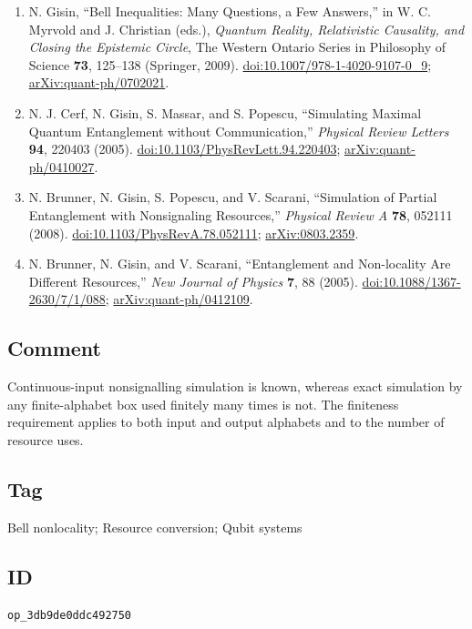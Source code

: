 \begin{enumerate}[label={},leftmargin=4.8em,labelsep=0.5em]
  \footnotesize
  \item[\textup{[Gis09]}]\label{ref:p29-gisin}
  N. Gisin, ``Bell Inequalities: Many Questions, a Few Answers,'' in
  W. C. Myrvold and J. Christian (eds.), \emph{Quantum Reality, Relativistic
  Causality, and Closing the Epistemic Circle}, The Western Ontario Series in
  Philosophy of Science \textbf{73}, 125--138 (Springer, 2009).
  \href{https://doi.org/10.1007/978-1-4020-9107-0_9}{doi:10.1007/978-1-4020-9107-0\_9};
  \href{https://arxiv.org/abs/quant-ph/0702021}{arXiv:quant-ph/0702021}.

  \item[\textup{[CGMP05]}]\label{ref:p29-cerf}
  N. J. Cerf, N. Gisin, S. Massar, and S. Popescu, ``Simulating Maximal
  Quantum Entanglement without Communication,'' \emph{Physical Review
  Letters} \textbf{94}, 220403 (2005).
  \href{https://doi.org/10.1103/PhysRevLett.94.220403}{doi:10.1103/PhysRevLett.94.220403};
  \href{https://arxiv.org/abs/quant-ph/0410027}{arXiv:quant-ph/0410027}.

  \item[\textup{[BGPS08]}]\label{ref:p29-brunner-pra}
  N. Brunner, N. Gisin, S. Popescu, and V. Scarani, ``Simulation of Partial
  Entanglement with Nonsignaling Resources,'' \emph{Physical Review A}
  \textbf{78}, 052111 (2008).
  \href{https://doi.org/10.1103/PhysRevA.78.052111}{doi:10.1103/PhysRevA.78.052111};
  \href{https://arxiv.org/abs/0803.2359}{arXiv:0803.2359}.

  \item[\textup{[BGS05]}]\label{ref:p29-brunner-njp}
  N. Brunner, N. Gisin, and V. Scarani, ``Entanglement and Non-locality Are
  Different Resources,'' \emph{New Journal of Physics} \textbf{7}, 88
  (2005). \href{https://doi.org/10.1088/1367-2630/7/1/088}{doi:10.1088/1367-2630/7/1/088};
  \href{https://arxiv.org/abs/quant-ph/0412109}{arXiv:quant-ph/0412109}.
\end{enumerate}

\subsection*{Comment}

Continuous-input nonsignalling simulation is known, whereas exact simulation
by any finite-alphabet box used finitely many times is not.  The finiteness
requirement applies to both input and output alphabets and to the number of
resource uses.

\subsection*{Tag}

Bell nonlocality; Resource conversion; Qubit systems

\subsection*{ID}

\texttt{op\_3db9de0ddc492750}

